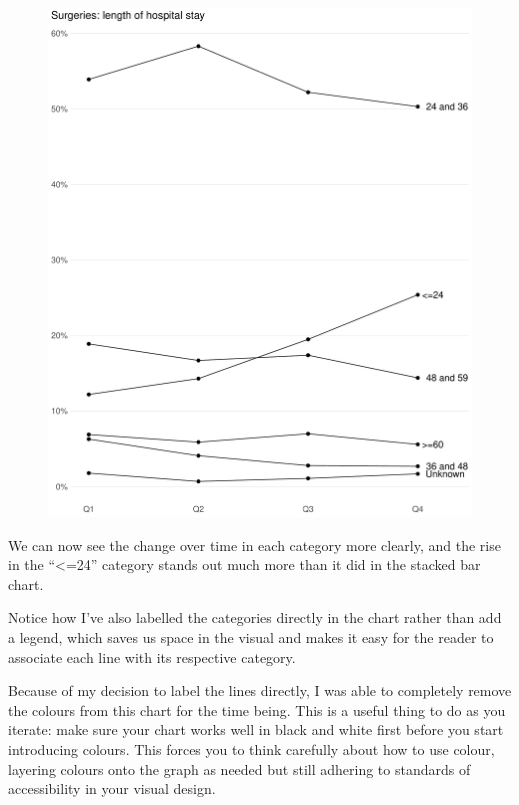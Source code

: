 \documentclass[
  letterpaper,
  DIV=11,
  numbers=noendperiod]{scrartcl}
\begin{document}
\begin{figure}[H]

{\centering \includegraphics{graph_makeover_files/figure-pdf/unnamed-chunk-4-1.pdf}

}

\end{figure}

We can now see the change over time in each category more clearly, and
the rise in the ``\textless=24'' category stands out much more than it
did in the stacked bar chart.

Notice how I've also labelled the categories directly in the chart
rather than add a legend, which saves us space in the visual and makes
it easy for the reader to associate each line with its respective
category.

Because of my decision to label the lines directly, I was able to
completely remove the colours from this chart for the time being. This
is a useful thing to do as you iterate: make sure your chart works well
in black and white first before you start introducing colours. This
forces you to think carefully about how to use colour, layering colours
onto the graph as needed but still adhering to standards of
accessibility in your visual design.
\end{document}
